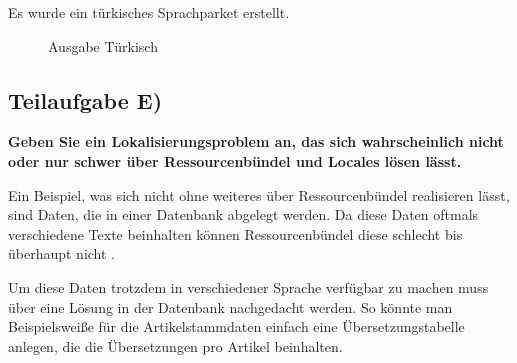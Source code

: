 Es wurde ein türkisches Sprachparket erstellt.

\begin{figure}[htb]
\begin{center}
\caption{Ausgabe Türkisch}
\end{center}
\end{figure}

\subsection{Teilaufgabe E)}
\textbf{Geben Sie ein Lokalisierungsproblem an, das sich wahrscheinlich nicht oder nur schwer
über Ressourcenbündel und Locales lösen lässt.}

Ein Beispiel, was sich nicht ohne weiteres über Ressourcenbündel realisieren
lässt, sind Daten, die in einer Datenbank abgelegt werden. Da diese Daten
oftmals verschiedene Texte beinhalten können Ressourcenbündel diese schlecht bis
überhaupt nicht . 

Um diese Daten trotzdem in verschiedener Sprache verfügbar zu machen muss über
eine Lösung in der Datenbank nachgedacht werden. So könnte man Beispielsweiße
für die Artikelstammdaten einfach eine Übersetzungstabelle anlegen, die die
Übersetzungen pro Artikel beinhalten.

\clearpage